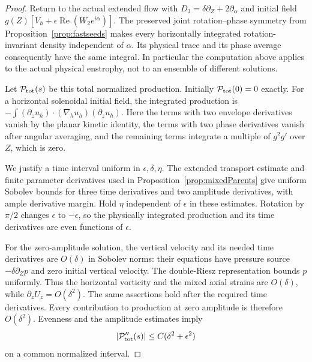 \documentclass[11pt]{article}
\theoremstyle{remark}
\begin{document}
\begin{proof}
Return to the actual extended flow with $D_3=\delta\partial_Z+
2\partial_\alpha$ and initial field $g(Z)[V_h+
\epsilon\operatorname{Re}(W_2e^{i\alpha})]$.
The preserved joint rotation--phase symmetry from
Proposition~\ref{prop:fastseeds} makes every horizontally integrated
rotation-invariant density independent of $\alpha$. Its physical trace
and its phase average consequently have the same integral. In particular
the computation above applies to the actual physical enstrophy, not to
an ensemble of different solutions.

Let $\mathcal P_{\rm tot}(s)$ be this total normalized production. Initially
$\mathcal P_{\rm tot}(0)=0$ exactly. For a horizontal solenoidal initial field,
the integrated production is
$-\int(\partial_z u_h)\cdot(\nabla_hu_h)(\partial_z u_h)$.
Here the terms with two envelope derivatives vanish by the planar
kinetic identity, the terms with two phase derivatives vanish after
angular averaging, and the remaining terms integrate a multiple of
$g^2g'$ over $Z$, which is zero.

We justify a time interval uniform in $\epsilon,\delta,\eta$.
The extended transport estimate and finite parameter derivatives used
in Proposition~\ref{prop:mixedParents} give uniform Sobolev bounds
for three time derivatives and two amplitude derivatives, with ample
derivative margin. Hold $\eta$ independent of $\epsilon$ in these
estimates. Rotation by $\pi/2$ changes $\epsilon$ to $-\epsilon$,
so the physically integrated production and its time derivatives are
even functions of $\epsilon$.

For the zero-amplitude solution, the vertical velocity and its needed
time derivatives are $O(\delta)$ in Sobolev norms: their equations
have pressure source $-\delta\partial_Zp$ and zero initial vertical
velocity. The double-Riesz representation bounds $p$ uniformly.
Thus the horizontal vorticity and the mixed axial strains are
$O(\delta)$, while $\partial_z U_z=O(\delta^2)$. The same assertions
hold after the required time derivatives. Every contribution to
production at zero amplitude is therefore $O(\delta^2)$.
Evenness and the amplitude estimates imply
\begin{equation}\label{eq:helicalTimeRemainder}
 |\mathcal P_{\rm tot}''(s)|\leq C(\delta^2+\epsilon^2)
\end{equation}
on a common normalized interval.


\end{proof}
\end{document}
